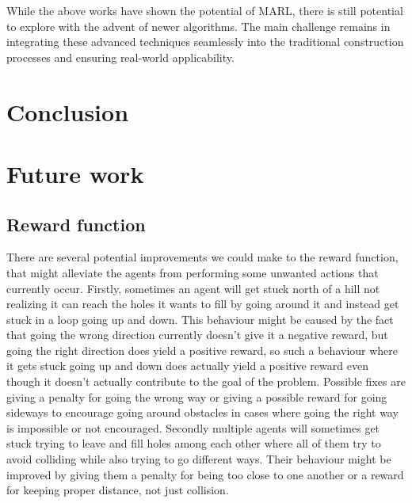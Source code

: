 \documentclass[conference]{IEEEtran}
\begin{document}
	While the above works have shown the potential of MARL, there is still potential to explore with the advent of newer algorithms. The main challenge remains in integrating these advanced techniques seamlessly into the traditional construction processes and ensuring real-world applicability.

	\noindent


	\section{Conclusion}


	\newpage

	\section{Future work}
	\subsection{Reward function}
	There are several potential improvements we could make to the reward function, that might alleviate the agents from performing some unwanted actions that currently occur.
	Firstly, sometimes an agent will get stuck north of a hill not realizing it can reach the holes it wants to fill by going around it and instead get stuck in a loop going up and down.
	This behaviour might be caused by the fact that going the wrong direction currently doesn't give it a negative reward, but going the right direction does yield a positive reward, so such a behaviour where it gets stuck going up and down does actually yield a positive reward even though it doesn't actually contribute to the goal of the problem.
	Possible fixes are giving a penalty for going the wrong way or giving a possible reward for going sideways to encourage going around obstacles in cases where going the right way is impossible or not encouraged.
	Secondly multiple agents will sometimes get stuck trying to leave and fill holes among each other where all of them try to avoid colliding while also trying to go different ways.
	Their behaviour might be improved by giving them a penalty for being too close to one another or a reward for keeping proper distance, not just collision.
\end{document}
